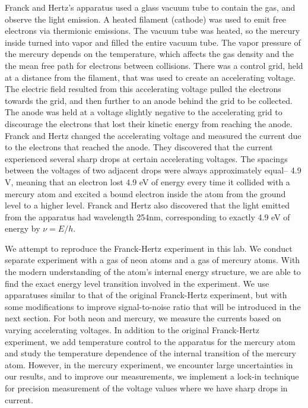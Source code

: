 \documentclass[prb,preprint]{revtex4-1}
\begin{document}
Franck and Hertz's apparatus used a glass vacuum tube to contain the gas, and observe the light emission. A heated filament (cathode) was used to emit free electrons via thermionic emissions. The vacuum tube was heated, so the mercury inside turned into vapor and filled the entire vacuum tube. The vapor pressure of the mercury depends on the temperature, which affects the gas density and the the mean free path for electrons between collisions. There was a control grid, held at a distance from the filament, that was used to create an accelerating voltage. The electric field resulted from this accelerating voltage pulled the electrons towards the grid, and then further to an anode behind the grid to be collected. The anode was held at a voltage slightly negative to the accelerating grid to discourage the electrons that lost their kinetic energy from reaching the anode. Franck and Hertz changed the accelerating voltage and measured the current due to the electrons that reached the anode. They discovered that the current experienced several sharp drops at certain accelerating voltages. The spacings between the voltages of two adjacent drops were always approximately equal-- 4.9 V, meaning that an electron lost 4.9 eV of energy every time it collided with a mercury atom and excited a bound electron inside the atom from the ground level to a higher level. Franck and Hertz also discovered that the light emitted from the apparatus had wavelength 254nm, corresponding to exactly 4.9 eV of energy by $\nu=E/h$.

We attempt to reproduce the Franck-Hertz experiment in this lab. We conduct separate experiment with a gas of neon atoms and a gas of mercury atoms. With the modern understanding of the atom's internal energy structure, we are able to find the exact energy level transition involved in the experiment. We use apparatuses similar to that of the original Franck-Hertz experiment, but with some modifications to improve signal-to-noise ratio that will be introduced in the next section. For both neon and mercury, we measure the currents based on varying accelerating voltages. In addition to the original Franck-Hertz experiment, we add temperature control to the apparatus for the mercury atom and study the temperature dependence of the internal transition of the mercury atom. However, in the mercury experiment, we encounter large uncertainties in our results, and to improve our measurements, we implement a lock-in technique for precision measurement of the voltage values where we have sharp drops in current.
\end{document}

